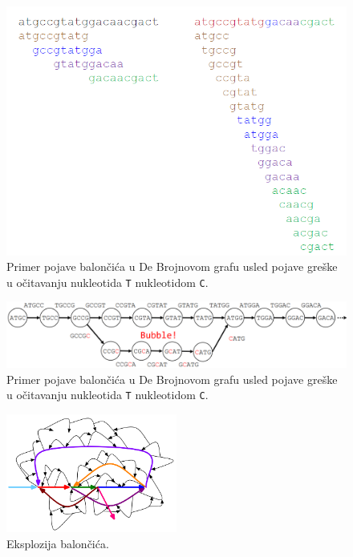 \begin{figure}[H]
	\centering
	\includegraphics[width=\textwidth]{poglavlja/3/slike/razbijanje_na_manje_kgrame.png}
	\caption{Primer pojave balon\v ci\'ca u De Brojnovom grafu usled pojave gre\v ske u o\v citavanju nukleotida \texttt{T} nukleotidom \texttt{C}.}
	\label{slika:manji kgrami}
\end{figure}

\begin{figure}[H]
	\centering
	\includegraphics[width=\textwidth]{poglavlja/3/slike/baloncic.png}
	\caption{Primer pojave balon\v ci\'ca u De Brojnovom grafu usled pojave gre\v ske u o\v citavanju nukleotida \texttt{T} nukleotidom \texttt{C}.}
	\label{slika:baloncic}
\end{figure} 

\begin{figure}[H]
	\centering
	\includegraphics[width=0.5\textwidth]{poglavlja/3/slike/eksplozija-baloncica.png}
	\caption{Eksplozija balon\v ci\'ca.}
	\label{slika:eksplozija baloncica}
\end{figure}

